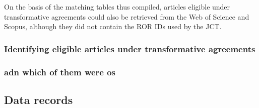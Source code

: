 \documentclass[a4paper,man,floatsintext,longtable,noextraspace,12pt]{apa6}
\begin{document}
On the basis of the matching tables thus compiled, articles eligible
under transformative agreements could also be retrieved from the Web of
Science and Scopus, although they did not contain the ROR IDs used by
the JCT.

\subsubsection{Identifying eligible articles under transformative
agreements}\label{identifying-eligible-articles-under-transformative-agreements}

\subsubsection{adn which of them were
os}\label{adn-which-of-them-were-os}

\subsection{Data records}\label{data-records}
\end{document}
